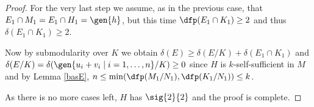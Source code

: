 \begin{proof}
\smallskip
For the very last step we assume, as in the previous case, that
$E_{1}\cap M_{1}=E_{1}\cap H_{1}=\gen{h}$, but this time
$\dfp(E_{1}\cap K_{1})\geq2$ and thus $\delta(E_{1}\cap K_{1})\geq2$.
%
%

Now by submodularity over $K$ we obtain
$\delta(E)\geq\delta(E/K)+\delta(E_{1}\cap K_{1})$
and $\delta(E/K)=\delta(\gen{u_{i}+v_{i}\mid i=1,\dots,n}/K)\geq0$ since $H$ is $k$-self-sufficient in $M$ and by Lemma \ref{basE},
$n\leq\min(\dfp(M_{1}/N_{1}),\dfp(K_{1}/N_{1}))\leq k$.

\smallskip
As there is no more cases left, $H$ has $\sig{2}{2}$ and the proof is complete.
\end{proof}

